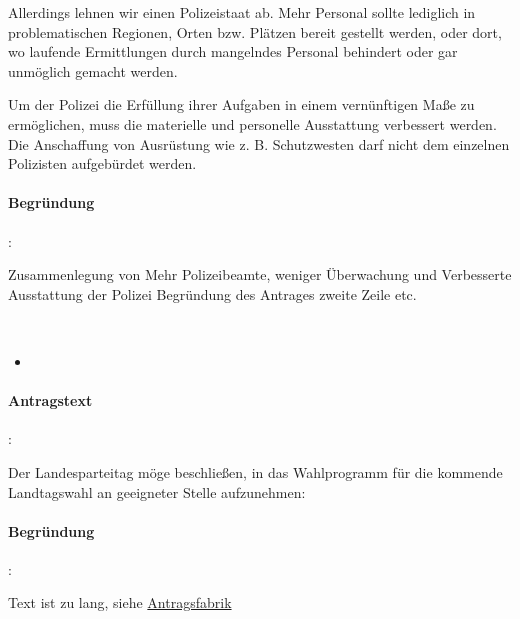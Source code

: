 Allerdings lehnen wir einen Polizeistaat ab. Mehr Personal sollte lediglich in problematischen Regionen, Orten bzw. Plätzen bereit gestellt werden, oder dort, wo laufende Ermittlungen durch mangelndes Personal behindert oder gar unmöglich gemacht werden.

Um der Polizei die Erfüllung ihrer Aufgaben in einem vernünftigen Maße zu ermöglichen, muss die materielle und personelle Ausstattung verbessert werden. Die Anschaffung von Ausrüstung wie z. B. Schutzwesten darf nicht dem einzelnen Polizisten aufgebürdet werden. 

\paragraph{Begründung}:

Zusammenlegung von {\Gu}Mehr Polizeibeamte, weniger Überwachung{\Go} und {\Gu}Verbesserte Ausstattung der Polizei{\Go} Begründung des Antrages zweite Zeile etc. 


\label{wpa:smsnotruf2}
\\
\begin{itemize}
\item {}
\end{itemize}

\paragraph{Antragstext}:

Der Landesparteitag möge beschließen, in das Wahlprogramm für die kommende Landtagswahl an geeigneter Stelle aufzunehmen: 


\paragraph{Begründung}:

Text ist zu lang, siehe \href{http://wiki.piratenpartei.de/LSA:Landesverband/Organisation/Mitgliederversammlung/2012.1/Antragsfabrik/Fl\%C3\%A4chendeckendes_barrierefreies_Notruf-_und_Informationssystem_per_Mobilfunk_\%28SMS-Notruf\%29_-_Zielgruppe_pr\%C3\%A4zisiert}{Antragsfabrik}

